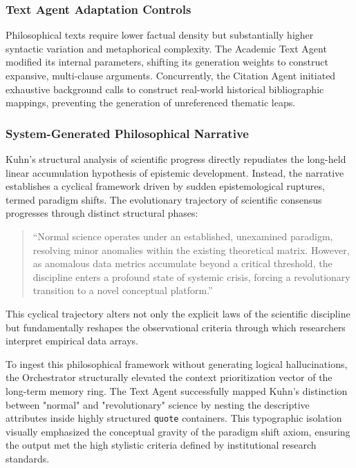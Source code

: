 \subsubsection{Text Agent Adaptation Controls}
Philosophical texts require lower factual density but substantially higher syntactic variation and metaphorical complexity. The Academic Text Agent modified its internal parameters, shifting its generation weights to construct expansive, multi-clause arguments. Concurrently, the Citation Agent initiated exhaustive background calls to construct real-world historical bibliographic mappings, preventing the generation of unreferenced thematic leaps.

\subsubsection{System-Generated Philosophical Narrative}
Kuhn’s structural analysis of scientific progress directly repudiates the long-held linear accumulation hypothesis of epistemic development. Instead, the narrative establishes a cyclical framework driven by sudden epistemological ruptures, termed paradigm shifts. The evolutionary trajectory of scientific consensus progresses through distinct structural phases:

\begin{quote}
``Normal science operates under an established, unexamined paradigm, resolving minor anomalies within the existing theoretical matrix. However, as anomalous data metrics accumulate beyond a critical threshold, the discipline enters a profound state of systemic crisis, forcing a revolutionary transition to a novel conceptual platform.''
\end{quote}

This cyclical trajectory alters not only the explicit laws of the scientific discipline but fundamentally reshapes the observational criteria through which researchers interpret empirical data arrays.

To ingest this philosophical framework without generating logical hallucinations, the Orchestrator structurally elevated the context prioritization vector of the long-term memory ring. The Text Agent successfully mapped Kuhn’s distinction between "normal" and "revolutionary" science by nesting the descriptive attributes inside highly structured \texttt{quote} containers. This typographic isolation visually emphasized the conceptual gravity of the paradigm shift axiom, ensuring the output met the high stylistic criteria defined by institutional research standards.

